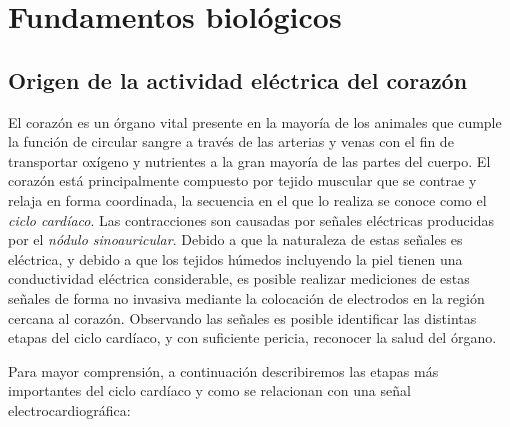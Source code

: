 \documentclass[conference]{IEEEtran}
\begin{document}
\section{Fundamentos biológicos}

\subsection{Origen de la actividad eléctrica del corazón}

El corazón es un órgano vital presente en la mayoría de los animales que cumple la
función de circular sangre a través de las arterias y venas con el fin de
transportar oxígeno y nutrientes a la gran mayoría de las partes del cuerpo.
El corazón está principalmente compuesto por tejido muscular que se contrae y relaja
en forma coordinada, la secuencia en el que lo realiza se conoce como el
\textit{ciclo cardíaco}. Las contracciones son causadas por señales eléctricas
producidas por el \textit{nódulo sinoauricular}. Debido a que la naturaleza de estas
señales es eléctrica, y debido a que los tejidos húmedos incluyendo la piel tienen
una conductividad eléctrica considerable, es posible realizar mediciones de estas
señales de forma no invasiva mediante la colocación de electrodos en la región
cercana al corazón. Observando las señales es posible identificar las distintas
etapas del ciclo cardíaco, y con suficiente pericia, reconocer la salud del órgano.


Para mayor comprensión, a continuación describiremos las etapas más importantes del
ciclo cardíaco y como se relacionan con una señal electrocardiográfica:
\cite{ecg_workings}
\end{document}
